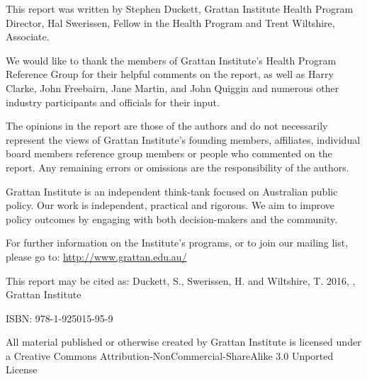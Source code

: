 This report was written by Stephen Duckett, Grattan Institute Health Program Director, Hal Swerissen, Fellow in the Health Program and Trent Wiltshire, Associate.

We would like to thank the members of Grattan Institute's Health Program Reference Group for their helpful comments on the report, as well as Harry Clarke, John Freebairn, Jane Martin, and John Quiggin and numerous other industry participants and officials for their input.

The opinions in the report are those of the authors and do not necessarily represent the views of Grattan Institute’s founding members, affiliates, individual board members reference group members or people who commented on the report. Any remaining errors or omissions are the responsibility of the authors.

Grattan Institute is an independent think-tank focused on Australian public policy. Our work is independent, practical and rigorous. We aim to improve policy outcomes by engaging with both decision-makers and the community.

For further information on the Institute's programs, or to join our mailing list, please go to:
\textcolor{blue}{\url{http://www.grattan.edu.au/}}

{\footnotesize
This report may be cited as:
\newline
Duckett, S., Swerissen, H. and Wiltshire, T. 2016, \emph{\mytitle}, Grattan Institute

ISBN: 978-1-925015-95-9

All material published or otherwise created by Grattan Institute is licensed under a Creative Commons Attribution-NonCommercial-ShareAlike 3.0 Unported License\par 
}